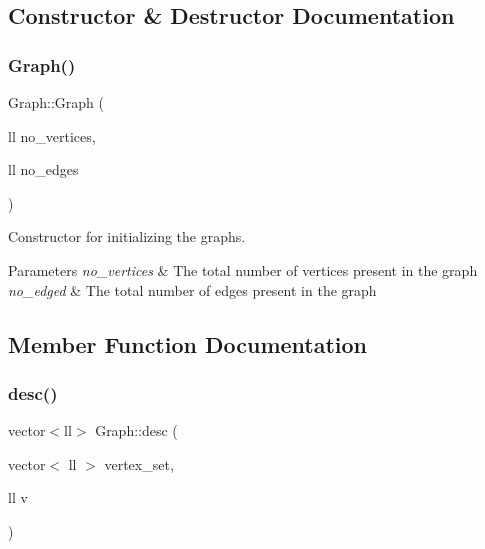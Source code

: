 \subsection{Constructor \& Destructor Documentation}
\mbox{\label{classGraph_ac4a367e9d88770686d6d68b386542418}} 
\subsubsection{\texorpdfstring{Graph()}{Graph()}}
{\footnotesize\ttfamily Graph\+::\+Graph (\begin{DoxyParamCaption}\item[{ll}]{no\+\_\+vertices,  }\item[{ll}]{no\+\_\+edges }\end{DoxyParamCaption})\hspace{0.3cm}{\ttfamily [inline]}}



Constructor for initializing the graphs. 


\begin{DoxyParams}{Parameters}
{\em no\+\_\+vertices} & The total number of vertices present in the graph \\
\hline
{\em no\+\_\+edged} & The total number of edges present in the graph \\
\hline
\end{DoxyParams}


\subsection{Member Function Documentation}
\mbox{\label{classGraph_a322040982fd02ab16e2a70b0f9c6758a}} 
\subsubsection{\texorpdfstring{desc()}{desc()}}
{\footnotesize\ttfamily vector$<$ll$>$ Graph\+::desc (\begin{DoxyParamCaption}\item[{vector$<$ ll $>$}]{vertex\+\_\+set,  }\item[{ll}]{v }\end{DoxyParamCaption})\hspace{0.3cm}{\ttfamily [inline]}}



